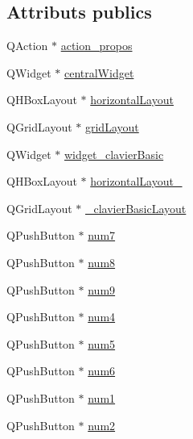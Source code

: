 \subsection*{\-Attributs publics}
\begin{DoxyCompactItemize}
\item 
\-Q\-Action $\ast$ \hyperlink{class_ui___main_window_ab5925c132a26c5f1b68712db69a43955}{action\-\_\-propos}
\item 
\-Q\-Widget $\ast$ \hyperlink{class_ui___main_window_a30075506c2116c3ed4ff25e07ae75f81}{central\-Widget}
\item 
\-Q\-H\-Box\-Layout $\ast$ \hyperlink{class_ui___main_window_acd6fdc9ebacc4b25b834162380d75ce8}{horizontal\-Layout}
\item 
\-Q\-Grid\-Layout $\ast$ \hyperlink{class_ui___main_window_a525ed3c5fe0784ac502ee222fba4e205}{grid\-Layout}
\item 
\-Q\-Widget $\ast$ \hyperlink{class_ui___main_window_a4684b35f7b6ce7e3b2372b2b01037ea2}{widget\-\_\-clavier\-Basic}
\item 
\-Q\-H\-Box\-Layout $\ast$ \hyperlink{class_ui___main_window_a80867018070156432923d0266cc9fe25}{horizontal\-Layout\-\_}
\item 
\-Q\-Grid\-Layout $\ast$ \hyperlink{class_ui___main_window_a7ccbf939ae6d5a0f57068259787f0f9f}{\-\_\-clavier\-Basic\-Layout}
\item 
\-Q\-Push\-Button $\ast$ \hyperlink{class_ui___main_window_a6b99070e2ed530d98b26f79ce1b5ecdf}{num7}
\item 
\-Q\-Push\-Button $\ast$ \hyperlink{class_ui___main_window_aeca50b654eb96a8bb380a34405c0e8a6}{num8}
\item 
\-Q\-Push\-Button $\ast$ \hyperlink{class_ui___main_window_a2a726c1956d35bdc8131b967f8a6d152}{num9}
\item 
\-Q\-Push\-Button $\ast$ \hyperlink{class_ui___main_window_acec9d7e0484591592b5b5aebe17c4d4c}{num4}
\item 
\-Q\-Push\-Button $\ast$ \hyperlink{class_ui___main_window_ae2cb73580dc5ebe9ff8bfdeb0be7fa4d}{num5}
\item 
\-Q\-Push\-Button $\ast$ \hyperlink{class_ui___main_window_a45c01137210fb27261aaa19e878b2771}{num6}
\item 
\-Q\-Push\-Button $\ast$ \hyperlink{class_ui___main_window_a06046b98ba8522d7866ff59b214208d4}{num1}
\item 
\-Q\-Push\-Button $\ast$ \hyperlink{class_ui___main_window_a42840810d6ba204b30a10316437fbac8}{num2}
\item 

\end{DoxyCompactItemize}
